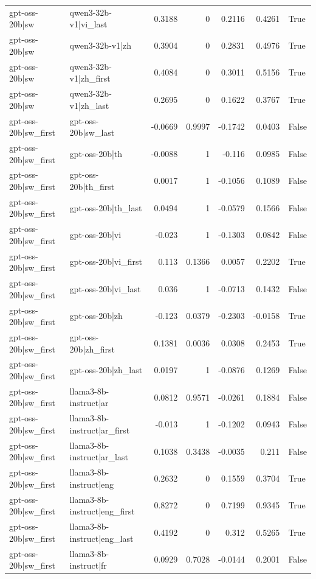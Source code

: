 \begin{table}
\begin{tabular}{l l r r r r l}
gpt-oss-20b|sw & qwen3-32b-v1|vi_last & 0.3188 & 0 & 0.2116 & 0.4261 & True \\
gpt-oss-20b|sw & qwen3-32b-v1|zh & 0.3904 & 0 & 0.2831 & 0.4976 & True \\
gpt-oss-20b|sw & qwen3-32b-v1|zh_first & 0.4084 & 0 & 0.3011 & 0.5156 & True \\
gpt-oss-20b|sw & qwen3-32b-v1|zh_last & 0.2695 & 0 & 0.1622 & 0.3767 & True \\
gpt-oss-20b|sw_first & gpt-oss-20b|sw_last & -0.0669 & 0.9997 & -0.1742 & 0.0403 & False \\
gpt-oss-20b|sw_first & gpt-oss-20b|th & -0.0088 & 1 & -0.116 & 0.0985 & False \\
gpt-oss-20b|sw_first & gpt-oss-20b|th_first & 0.0017 & 1 & -0.1056 & 0.1089 & False \\
gpt-oss-20b|sw_first & gpt-oss-20b|th_last & 0.0494 & 1 & -0.0579 & 0.1566 & False \\
gpt-oss-20b|sw_first & gpt-oss-20b|vi & -0.023 & 1 & -0.1303 & 0.0842 & False \\
gpt-oss-20b|sw_first & gpt-oss-20b|vi_first & 0.113 & 0.1366 & 0.0057 & 0.2202 & True \\
gpt-oss-20b|sw_first & gpt-oss-20b|vi_last & 0.036 & 1 & -0.0713 & 0.1432 & False \\
gpt-oss-20b|sw_first & gpt-oss-20b|zh & -0.123 & 0.0379 & -0.2303 & -0.0158 & True \\
gpt-oss-20b|sw_first & gpt-oss-20b|zh_first & 0.1381 & 0.0036 & 0.0308 & 0.2453 & True \\
gpt-oss-20b|sw_first & gpt-oss-20b|zh_last & 0.0197 & 1 & -0.0876 & 0.1269 & False \\
gpt-oss-20b|sw_first & llama3-8b-instruct|ar & 0.0812 & 0.9571 & -0.0261 & 0.1884 & False \\
gpt-oss-20b|sw_first & llama3-8b-instruct|ar_first & -0.013 & 1 & -0.1202 & 0.0943 & False \\
gpt-oss-20b|sw_first & llama3-8b-instruct|ar_last & 0.1038 & 0.3438 & -0.0035 & 0.211 & False \\
gpt-oss-20b|sw_first & llama3-8b-instruct|eng & 0.2632 & 0 & 0.1559 & 0.3704 & True \\
gpt-oss-20b|sw_first & llama3-8b-instruct|eng_first & 0.8272 & 0 & 0.7199 & 0.9345 & True \\
gpt-oss-20b|sw_first & llama3-8b-instruct|eng_last & 0.4192 & 0 & 0.312 & 0.5265 & True \\
gpt-oss-20b|sw_first & llama3-8b-instruct|fr & 0.0929 & 0.7028 & -0.0144 & 0.2001 & False \\

\end{tabular}
\end{table}
